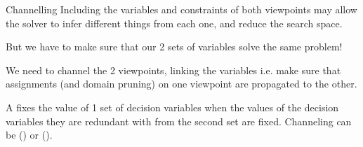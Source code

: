 \documentclass{cons-beamer}
\begin{document}
\begin{frame}{Channelling}
  Including the variables and constraints of both viewpoints may allow the solver to infer different things from each one, and reduce the search space. 
  \vfill

  But we have to make sure that our 2 sets of variables solve the same problem! 
  \vfill

  \alert{We need to channel the 2 viewpoints}, linking the variables i.e. make sure that assignments (and domain pruning) on one viewpoint are propagated to the other.
  \vfill

  \begin{definition}
    A  fixes the value of 1 set of decision variables when the values of the decision variables they are redundant with from the second set are fixed. Channeling can be
    () or (). %
  \end{definition}
\end{frame}
\end{document}
